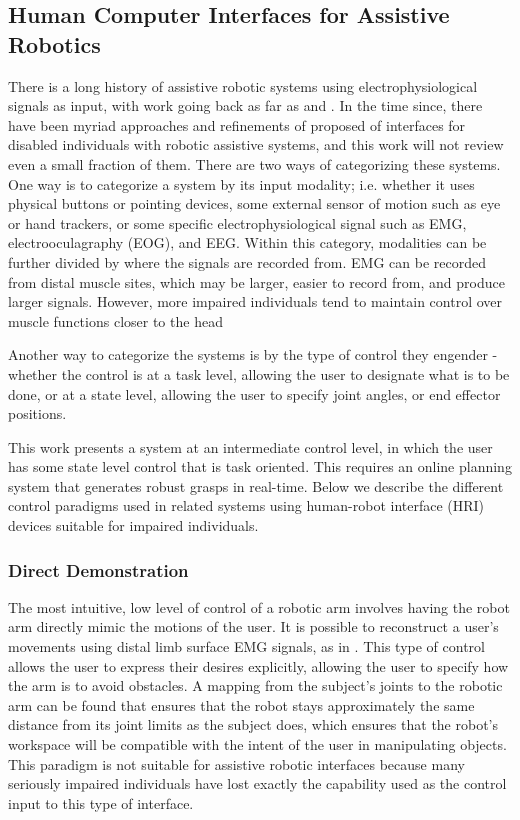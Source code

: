 
\subsection{Human Computer Interfaces for Assistive Robotics} 
There is a long history of assistive robotic systems using electrophysiological signals as input, with work going back as far as  \cite{schmidl-65} and \cite{sherman-65}. In the time since, there have been myriad approaches and refinements of proposed of interfaces for disabled individuals with robotic assistive systems, and this work will not review even a small fraction of them. There are two ways of categorizing these systems. One way is to categorize a system by its input modality; i.e. whether it uses physical buttons or pointing devices, some external sensor of motion such as eye or hand trackers, or some specific electrophysiological signal such as EMG, electrooculagraphy (EOG), and EEG.  Within this category, modalities can be further divided by where the signals are recorded from. EMG can be recorded from distal muscle sites, which may be larger, easier to record from, and produce larger signals. However, more impaired individuals tend to maintain control over muscle functions closer to the head

Another way to categorize the systems is by the type of control they engender - whether the control is at a task level, allowing the user to designate what is to be done, or at a state level, allowing the user to specify joint angles, or end effector positions.  

This work presents a system at an intermediate control level, in which the user has some state level control that is task oriented. This requires an online planning system that generates robust grasps in real-time. Below we describe the different control paradigms used in related systems using human-robot interface (HRI) devices suitable for impaired individuals.  

\subsubsection{Direct Demonstration}
 The most intuitive, low level of control of a robotic arm involves having the robot arm directly mimic the motions of the user. It is possible to reconstruct a user's movements using distal limb surface EMG signals, as in \cite{Artemiadis2011,Castellini2009}.  This type of control allows the user to express their desires explicitly, allowing the user to specify how the arm is to avoid obstacles. A mapping from the subject's joints to the robotic arm can be found that ensures that the robot stays approximately the same distance from its joint limits as the subject does, which ensures that the robot's workspace will be compatible with the intent of the user in manipulating objects. This paradigm is not suitable for assistive robotic interfaces because many seriously impaired individuals have lost exactly the capability used as the control input to this type of interface.  
 
